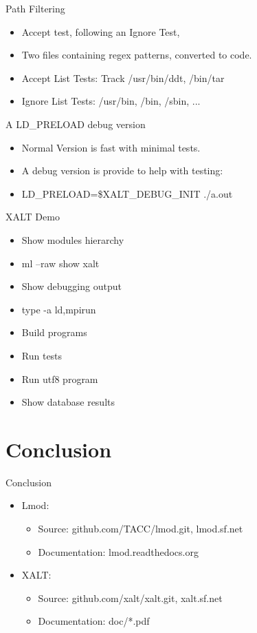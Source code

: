 \documentclass{beamer}
\begin{document}
\begin{frame}{Path Filtering}
  \begin{itemize}
    \item Accept test, following an Ignore Test,
    \item Two files containing regex patterns, converted to code.
    \item Accept List Tests: Track /usr/bin/ddt, /bin/tar
    \item Ignore List Tests: /usr/bin, /bin, /sbin, ...
  \end{itemize}
\end{frame}

\begin{frame}{A LD\_PRELOAD debug version}
  \begin{itemize}
    \item Normal Version is fast with minimal tests.
    \item A debug version is provide to help with testing:
    \item LD\_PRELOAD=\$XALT\_DEBUG\_INIT ./a.out
  \end{itemize}
\end{frame}

\begin{frame}{XALT Demo}
  \begin{itemize}
    \item Show modules hierarchy
    \item ml --raw show xalt
    \item Show debugging output
    \item type -a {ld,mpirun}
    \item Build programs
    \item Run tests
    \item Run utf8 program
    \item Show database results
  \end{itemize}
\end{frame}


\section{Conclusion}
\begin{frame}{Conclusion}
  \begin{itemize}
    \item Lmod:
      \begin{itemize}
        \item Source: github.com/TACC/lmod.git, lmod.sf.net
        \item Documentation: lmod.readthedocs.org
      \end{itemize}
    \item XALT:
      \begin{itemize}
        \item Source: github.com/xalt/xalt.git, xalt.sf.net
        \item Documentation: doc/*.pdf
      \end{itemize}
  \end{itemize}
\end{frame}
\end{document}
